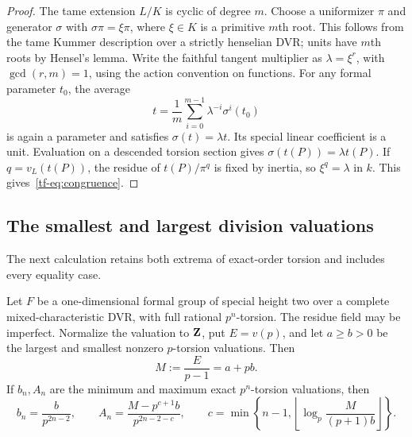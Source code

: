 \begin{proof}
The tame extension $L/K$ is cyclic of degree $m$. Choose a uniformizer $\pi$ and generator $\sigma$ with $\sigma\pi=\xi\pi$, where $\xi\in K$ is a primitive $m$th root. This follows from the tame Kummer description over a strictly henselian DVR; units have $m$th roots by Hensel's lemma. Write the faithful tangent multiplier as $\lambda=\xi^r$, with $\gcd(r,m)=1$, using the action convention on functions. For any formal parameter $t_0$, the average
\[
 t=\frac1m\sum_{i=0}^{m-1}\lambda^{-i}\sigma^i(t_0)
\]
is again a parameter and satisfies $\sigma(t)=\lambda t$. Its special linear coefficient is a unit. Evaluation on a descended torsion section gives
$\sigma(t(P))=\lambda t(P)$. If $q=v_L(t(P))$, the residue of $t(P)/\pi^q$ is fixed by inertia, so $\xi^q=\lambda$ in $k$. This gives~\eqref{tf-eq:congruence}.
\end{proof}

\subsection{The smallest and largest division valuations}
The next calculation retains both extrema of exact-order torsion and includes every equality case.

\begin{lemma}\label{tf-lem:extrema}
Let $F$ be a one-dimensional formal group of special height two over a complete mixed-characteristic DVR, with full rational $p^n$-torsion. The residue field may be imperfect. Normalize the valuation to $\mathbf Z$, put $E=v(p)$, and let $a\ge b>0$ be the largest and smallest nonzero $p$-torsion valuations. Then
\begin{equation}\label{tf-eq:mass}
 M:=\frac{E}{p-1}=a+pb.
\end{equation}
If $b_n,A_n$ are the minimum and maximum exact $p^n$-torsion valuations, then
\begin{equation}\label{tf-eq:extrema}
 b_n=\frac b{p^{2n-2}},\qquad
 A_n=\frac{M-p^{c+1}b}{p^{2n-2-c}},\qquad
 c=\min\left\{n-1,\left\lfloor\log_p\frac{M}{(p+1)b}\right\rfloor\right\}.
\end{equation}
\end{lemma}

